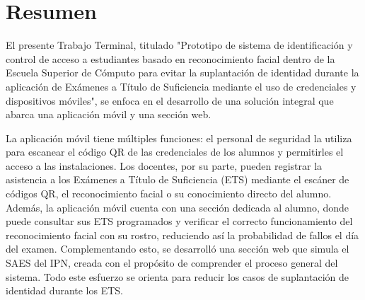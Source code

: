 \documentclass[11pt,openany]{book}
\begin{document}



\newpage

\section*{Resumen}

El presente Trabajo Terminal, titulado "Prototipo de sistema de identificación y control de acceso a estudiantes basado en reconocimiento facial dentro de la Escuela Superior de Cómputo para evitar la suplantación de identidad durante la aplicación de Exámenes a Título de Suficiencia mediante el uso de credenciales y dispositivos móviles", se enfoca en el desarrollo de una solución integral que abarca una aplicación móvil y una sección web.

La aplicación móvil tiene múltiples funciones: el personal de seguridad la utiliza para escanear el código QR de las credenciales de los alumnos y permitirles el acceso a las instalaciones. Los docentes, por su parte, pueden registrar la asistencia a los Exámenes a Título de Suficiencia (ETS) mediante el escáner de códigos QR, el reconocimiento facial o su conocimiento directo del alumno. Además, la aplicación móvil cuenta con una sección dedicada al alumno, donde puede consultar sus ETS programados y verificar el correcto funcionamiento del reconocimiento facial con su rostro, reduciendo así la probabilidad de fallos el día del examen. Complementando esto, se desarrolló una sección web que simula el SAES del IPN, creada con el propósito de comprender el proceso general del sistema. Todo este esfuerzo se orienta para reducir los casos de  suplantación de identidad durante los ETS.

\newpage



\newpage



\newpage



\newpage

\tableofcontents
\listoffigures 
\listoftables
\printnomenclature
\end{document}
